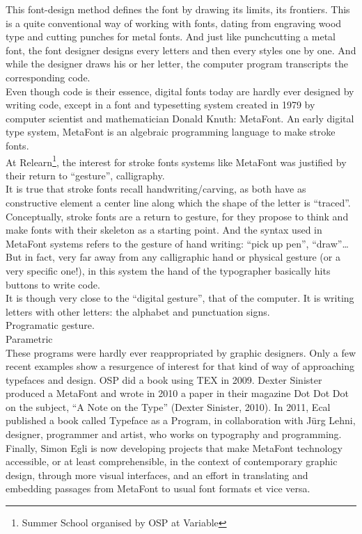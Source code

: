 \documentclass[danish,a2paper,11pt]{scrartcl}
\begin{document}
\begin{multicols*}{3}
This font-design method defines the font by drawing its limits, its frontiers. This is a quite conventional way of working with fonts, dating from engraving wood type and cutting punches for metal fonts. And just like punchcutting a metal font, the font designer designs every letters and then every styles one by one. And while the designer draws his or her letter, the computer program transcripts the corresponding code.\\
Even though code is their essence, digital fonts today are hardly ever designed by writing code, except in a font and typesetting system created in 1979 by computer scientist and mathematician Donald Knuth: MetaFont. An early digital type system, MetaFont is an algebraic programming language to make stroke fonts.\\
At Relearn\footnote{Summer School organised by OSP at Variable}, the interest for stroke fonts systems like MetaFont was justified by their return to “gesture”, calligraphy.\\
It is true that stroke fonts recall handwriting/carving, as both have as constructive element a center line along which the shape of the letter is “traced”. Conceptually, stroke fonts are a return to gesture, for they propose to think and make fonts with their skeleton as a starting point. 
And the syntax used in MetaFont systems refers to the gesture of hand writing: “pick up pen”, “draw”\ldots\\
But in fact, very far away from any calligraphic hand or physical gesture (or a very specific one!), in this system the hand of the typographer basically hits buttons to write code.\\
It is though very close to the “digital gesture”, that of the computer. It is writing letters with other letters: the alphabet and punctuation signs.\\
Programatic gesture.\\
Parametric\\
These programs were hardly ever reappropriated by graphic designers. Only a few recent examples show a resurgence of interest for that kind of way of approaching typefaces and design. OSP did a book using TEX in 2009. Dexter Sinister produced a MetaFont and wrote in 2010 a paper in their magazine Dot Dot Dot on the subject, “A Note on the Type” (Dexter Sinister, 2010). In 2011, Ecal published a book called Typeface as a Program, in collaboration with Jürg Lehni, designer, programmer and artist, who works on typography and programming. Finally, Simon Egli is now developing projects that make MetaFont technology accessible, or at least comprehensible, in the context of contemporary graphic design, through more visual interfaces, and an effort in translating and embedding passages from MetaFont to usual font formats et vice versa.\\

\end{multicols*}
\end{document}
